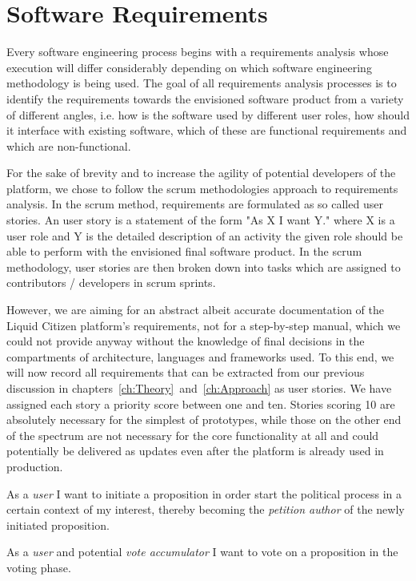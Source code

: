 \section{Software Requirements}
\label{sec:SoftwareRequirements}

Every software engineering process begins with a requirements analysis whose execution will differ considerably depending on which software engineering methodology is being used.
The goal of all requirements analysis processes is to identify the requirements towards the envisioned software product from a variety of different angles, i.e. how is the software used by different user roles, how should it interface with existing software, which of these are functional requirements and which are non-functional.

For the sake of brevity and to increase the agility of potential developers of the platform, we chose to follow the scrum methodologies approach to requirements analysis.
In the scrum method, requirements are formulated as so called user stories.
An user story is a statement of the form "As X I want Y." where X is a user role and Y is the detailed description of an activity the given role should be able to perform with the envisioned final software product.
In the scrum methodology, user stories are then broken down into tasks which are assigned to contributors / developers in scrum sprints.

However, we are aiming for an abstract albeit accurate documentation of the Liquid Citizen platform's requirements, not for a step-by-step manual, which we could not provide anyway without the knowledge of final decisions in the compartments of architecture, languages and frameworks used.
To this end, we will now record all requirements that can be extracted from our previous discussion in chapters~\ref{ch:Theory}~and~\ref{ch:Approach} as user stories.
We have assigned each story a priority score between one and ten. Stories scoring 10 are absolutely necessary for the simplest of prototypes, while those on the other end of the spectrum are not necessary for the core functionality at all and could potentially be delivered as updates even after the platform is already used in production.

As a \textit{user} I want to initiate a proposition in order start the political process in a certain context of my interest, thereby becoming the \textit{petition author} of the newly initiated proposition.

As a \textit{user} and potential \textit{vote accumulator} I want to vote on a proposition in the voting phase.

